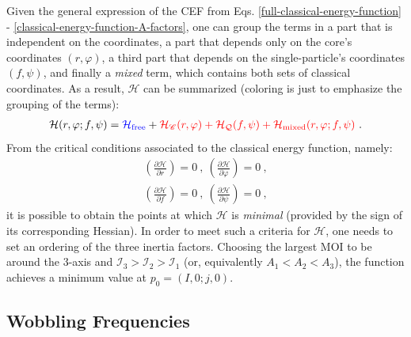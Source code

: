 Given the general expression of the CEF from Eqs. \ref{full-classical-energy-function} - \ref{classical-energy-function-A-factors}, one can group the terms in a part that is independent on the coordinates, a part that depends only on the core's coordinates $(r,\varphi)$, a third part that depends on the single-particle's coordinates $(f,\psi)$, and finally a \emph{mixed} term, which contains both sets of classical coordinates. As a result, $\mathcal{H}$ can be summarized (coloring is just to emphasize the grouping of the terms):
\begin{align}
    \mathcal{H}(r,\varphi;f,\psi)={\color{blue}\mathcal{H}_\text{free}}+{\color{red}\mathcal{H}_\mathscr{C}(r,\varphi)+\mathcal{H}_\mathcal{Q}(f,\psi)+\mathcal{H}_\text{mixed}(r,\varphi;f,\psi)}\ .
    \label{classical-energy-function-terms}
\end{align}
From the critical conditions associated to the classical energy function, namely:
\begin{gather*}
    \left(\frac{\partial \mathcal{H}}{\partial r}\right)=0\ ,\ \left(\frac{\partial \mathcal{H}}{\partial \varphi}\right)=0\ ,\\
    \left(\frac{\partial \mathcal{H}}{\partial f}\right)=0\ ,\ \left(\frac{\partial \mathcal{H}}{\partial \psi}\right)=0\ ,
\end{gather*}
it is possible to obtain the points at which $\mathcal{H}$ is \emph{minimal} (provided by the sign of its corresponding Hessian). In order to meet such a criteria for $\mathcal{H}$, one needs to set an ordering of the three inertia factors. Choosing the largest MOI to be around the $3$-axis and $\mathcal{I}_3>\mathcal{I}_2>\mathcal{I}_1$ (or, equivalently $A_1<A_2<A_3$), the function achieves a minimum value at $p_0=(I,0;j,0)$.

\subsection{Wobbling Frequencies}


